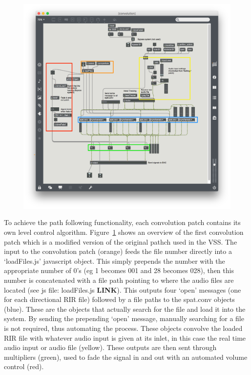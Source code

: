\documentclass[../../main.tex]{subfiles}
\begin{document}
			\begin{figure}[H]
				\centerline{\includegraphics[scale = 0.5]{Sections/Implementation/Max/images/Max/Iteration3/convPatch_edit.png}}
				\caption{}
				\label{convPatch}
			\end{figure}

			To achieve the path following functionality, each convolution patch contains its own level control algorithm. Figure~\ref{convPatch} shows an overview of the first convolution patch which is a modified version of the original pathch used in the \ac{VSS}. The input to the convolution patch (orange) feeds the file number directly into a `loadFiles.js' javascript object. This simply prepends the number with the appropriate number of 0's (eg 1 becomes 001 and 28 becomes 028), then this number is concatenated with a file path pointing to where the audio files are located (see js file: loadFiles.js \textbf{LINK}). This outputs four `open' messages (one for each directional \ac{RIR} file)  followed by a file paths to the spat.conv objects (blue). These are the objects that actually search for the file and load it into the system. By sending the prepending `open' message, manually searching for a file is not required, thus automating the process. These objects convolve the loaded \ac{RIR} file with whatever audio input is given at its inlet, in this case the real time audio input or audio file (yellow). These outputs are then sent through multipliers (green), used to fade the signal in and out with an automated volume control (red).
		 	
\end{document}
